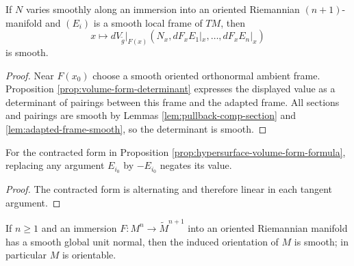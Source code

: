 \begin{lemma}
\label{lem:normal-restrict-frame-smooth}





If $N$ varies smoothly along an immersion into an oriented Riemannian $(n+1)$-manifold and $(E_i)$ is a smooth local frame of $TM$, then
\[
x\mapsto dV_{\widetilde g}|_{F(x)}(N_x,dF_xE_1|_x,\ldots,dF_xE_n|_x)
\]
is smooth.
\end{lemma}

\begin{proof}

\sketch Near $F(x_0)$ choose a smooth oriented orthonormal ambient frame. Proposition \ref{prop:volume-form-determinant} expresses the displayed value as a determinant of pairings between this frame and the adapted frame. All sections and pairings are smooth by Lemmas \ref{lem:pullback-comp-section} and \ref{lem:adapted-frame-smooth}, so the determinant is smooth.
\end{proof}

\begin{lemma}
\label{lem:normal-restrict-neg-member}





For the contracted form in Proposition \ref{prop:hypersurface-volume-form-formula}, replacing any argument $E_{i_0}$ by $-E_{i_0}$ negates its value.
\end{lemma}

\begin{proof}

\sketch The contracted form is alternating and therefore linear in each tangent argument.
\end{proof}

\begin{proposition}
\label{prop:hypersurface-orientable-of-normal}





If $n\ge1$ and an immersion $F:M^n\to\widetilde M^{n+1}$ into an oriented Riemannian manifold has a smooth global unit normal, then the induced orientation of $M$ is smooth; in particular $M$ is orientable.
\end{proposition}

